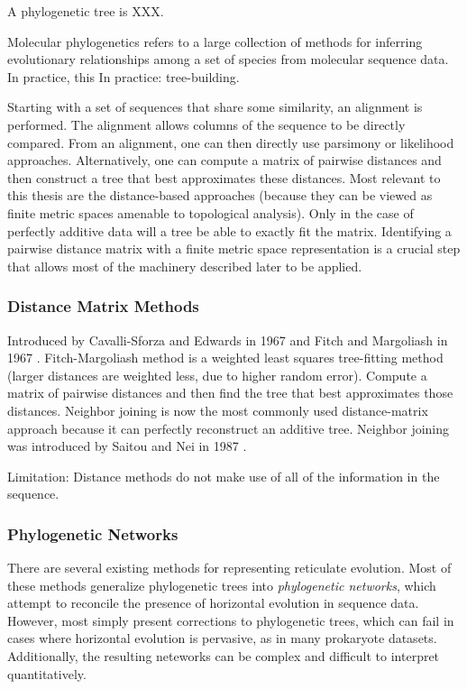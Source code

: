 A phylogenetic tree is XXX.


Molecular phylogenetics refers to a large collection of methods for inferring evolutionary relationships among a set of species from molecular sequence data.
In practice, this 
In practice: tree-building.

Starting with a set of sequences that share some similarity, an alignment is performed.
The alignment allows columns of the sequence to be directly compared.
From an alignment, one can then directly use parsimony or likelihood approaches.
Alternatively, one can compute a matrix of pairwise distances and then construct a tree that best approximates these distances.
Most relevant to this thesis are the distance-based approaches (because they can be viewed as finite metric spaces amenable to topological analysis).
Only in the case of perfectly additive data will a tree be able to exactly fit the matrix.
Identifying a pairwise distance matrix with a finite metric space representation is a crucial step that allows most of the machinery described later to be applied.

\subsubsection{Distance Matrix Methods}

Introduced by Cavalli-Sforza and Edwards in 1967 \cite{CavalliSforza:1967th} and Fitch and Margoliash in 1967 \cite{Fitch:1967we}.
Fitch-Margoliash method is a weighted least squares tree-fitting method (larger distances are weighted less, due to higher random error).
Compute a matrix of pairwise distances and then find the tree that best approximates those distances.
Neighbor joining is now the most commonly used distance-matrix approach because it can perfectly reconstruct an additive tree.
Neighbor joining was introduced by Saitou and Nei in 1987 \cite{Saitou:1987wo}.

Limitation: Distance methods do not make use of all of the information in the sequence.

\subsubsection{Phylogenetic Networks}

There are several existing methods for representing reticulate evolution.
Most of these methods generalize phylogenetic trees into \emph{phylogenetic networks}, which attempt to reconcile the presence of horizontal evolution in sequence data.
However, most simply present corrections to phylogenetic trees, which can fail in cases where horizontal evolution is pervasive, as in many prokaryote datasets.
Additionally, the resulting neteworks can be complex and difficult to interpret quantitatively.

